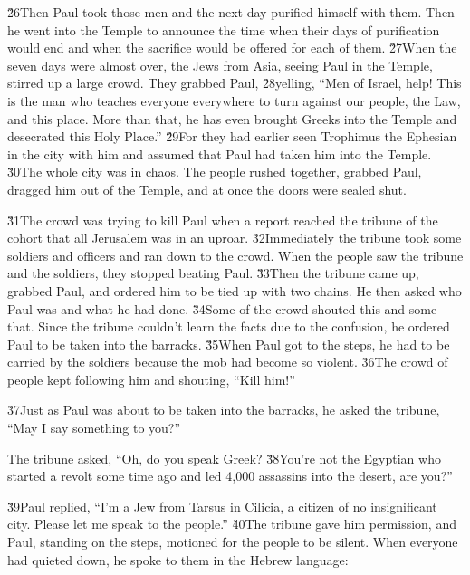 \v{26}Then Paul took those men and the next day purified himself with them. Then he went into the Temple to announce the time when their days of purification would end and when the sacrifice would be offered for each of them. \v{27}When the seven days were almost over, the Jews from Asia, seeing Paul in the Temple, stirred up a large crowd. They grabbed Paul, \v{28}yelling, ``Men of Israel, help! This is the man who teaches everyone everywhere to turn against our people, the Law, and this place. More than that, he has even brought Greeks into the Temple and desecrated this Holy Place.'' \v{29}For they had earlier seen Trophimus the Ephesian in the city with him and assumed that Paul had taken him into the Temple. \v{30}The whole city was in chaos. The people rushed together, grabbed Paul, dragged him out of the Temple, and at once the doors were sealed shut.

\v{31}The crowd was trying to kill Paul when a report reached the tribune of the cohort that all Jerusalem was in an uproar. \v{32}Immediately the tribune took some soldiers and officers and ran down to the crowd. When the people saw the tribune and the soldiers, they stopped beating Paul. \v{33}Then the tribune came up, grabbed Paul, and ordered him to be tied up with two chains. He then asked who Paul was and what he had done. \v{34}Some of the crowd shouted this and some that. Since the tribune couldn't learn the facts due to the confusion, he ordered Paul to be taken into the barracks. \v{35}When Paul got to the steps, he had to be carried by the soldiers because the mob had become so violent. \v{36}The crowd of people kept following him and shouting, ``Kill him!''

\v{37}Just as Paul was about to be taken into the barracks, he asked the tribune, ``May I say something to you?''

The tribune asked, ``Oh, do you speak Greek? \v{38}You're not the Egyptian who started a revolt some time ago and led 4,000 assassins into the desert, are you?''

\v{39}Paul replied, ``I'm a Jew from Tarsus in Cilicia, a citizen of no insignificant city. Please let me speak to the people.'' \v{40}The tribune gave him permission, and Paul, standing on the steps, motioned for the people to be silent. When everyone had quieted down, he spoke to them in the Hebrew language:

